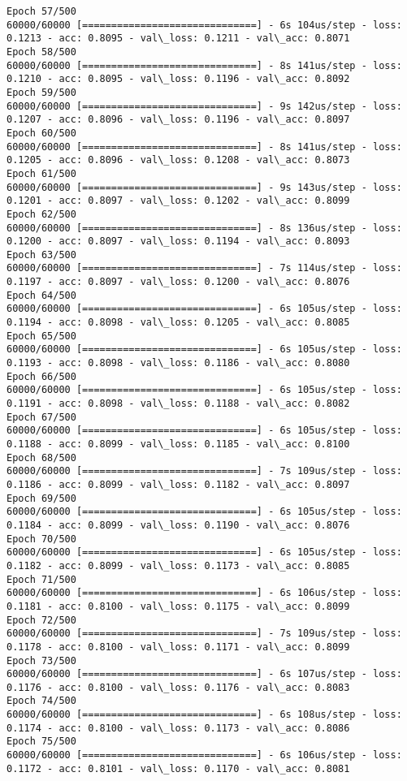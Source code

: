 \documentclass[11pt]{article}
\begin{document}
\begin{Verbatim}[commandchars=\\\{\}]
Epoch 57/500
60000/60000 [==============================] - 6s 104us/step - loss: 0.1213 - acc: 0.8095 - val\_loss: 0.1211 - val\_acc: 0.8071
Epoch 58/500
60000/60000 [==============================] - 8s 141us/step - loss: 0.1210 - acc: 0.8095 - val\_loss: 0.1196 - val\_acc: 0.8092
Epoch 59/500
60000/60000 [==============================] - 9s 142us/step - loss: 0.1207 - acc: 0.8096 - val\_loss: 0.1196 - val\_acc: 0.8097
Epoch 60/500
60000/60000 [==============================] - 8s 141us/step - loss: 0.1205 - acc: 0.8096 - val\_loss: 0.1208 - val\_acc: 0.8073
Epoch 61/500
60000/60000 [==============================] - 9s 143us/step - loss: 0.1201 - acc: 0.8097 - val\_loss: 0.1202 - val\_acc: 0.8099
Epoch 62/500
60000/60000 [==============================] - 8s 136us/step - loss: 0.1200 - acc: 0.8097 - val\_loss: 0.1194 - val\_acc: 0.8093
Epoch 63/500
60000/60000 [==============================] - 7s 114us/step - loss: 0.1197 - acc: 0.8097 - val\_loss: 0.1200 - val\_acc: 0.8076
Epoch 64/500
60000/60000 [==============================] - 6s 105us/step - loss: 0.1194 - acc: 0.8098 - val\_loss: 0.1205 - val\_acc: 0.8085
Epoch 65/500
60000/60000 [==============================] - 6s 105us/step - loss: 0.1193 - acc: 0.8098 - val\_loss: 0.1186 - val\_acc: 0.8080
Epoch 66/500
60000/60000 [==============================] - 6s 105us/step - loss: 0.1191 - acc: 0.8098 - val\_loss: 0.1188 - val\_acc: 0.8082
Epoch 67/500
60000/60000 [==============================] - 6s 105us/step - loss: 0.1188 - acc: 0.8099 - val\_loss: 0.1185 - val\_acc: 0.8100
Epoch 68/500
60000/60000 [==============================] - 7s 109us/step - loss: 0.1186 - acc: 0.8099 - val\_loss: 0.1182 - val\_acc: 0.8097
Epoch 69/500
60000/60000 [==============================] - 6s 105us/step - loss: 0.1184 - acc: 0.8099 - val\_loss: 0.1190 - val\_acc: 0.8076
Epoch 70/500
60000/60000 [==============================] - 6s 105us/step - loss: 0.1182 - acc: 0.8099 - val\_loss: 0.1173 - val\_acc: 0.8085
Epoch 71/500
60000/60000 [==============================] - 6s 106us/step - loss: 0.1181 - acc: 0.8100 - val\_loss: 0.1175 - val\_acc: 0.8099
Epoch 72/500
60000/60000 [==============================] - 7s 109us/step - loss: 0.1178 - acc: 0.8100 - val\_loss: 0.1171 - val\_acc: 0.8099
Epoch 73/500
60000/60000 [==============================] - 6s 107us/step - loss: 0.1176 - acc: 0.8100 - val\_loss: 0.1176 - val\_acc: 0.8083
Epoch 74/500
60000/60000 [==============================] - 6s 108us/step - loss: 0.1174 - acc: 0.8100 - val\_loss: 0.1173 - val\_acc: 0.8086
Epoch 75/500
60000/60000 [==============================] - 6s 106us/step - loss: 0.1172 - acc: 0.8101 - val\_loss: 0.1170 - val\_acc: 0.8081

\end{Verbatim}
\end{document}
